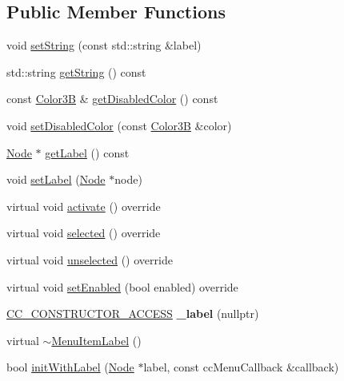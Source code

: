 \subsection*{Public Member Functions}
\begin{DoxyCompactItemize}
\item 
void \hyperlink{classMenuItemLabel_a792525a9b4ca9f196bb670ec849b7e42}{set\+String} (const std\+::string \&label)
\item 
std\+::string \hyperlink{classMenuItemLabel_a8eb49b748631f0f68d85ab7e61eaa21d}{get\+String} () const
\item 
const \hyperlink{structColor3B}{Color3B} \& \hyperlink{classMenuItemLabel_acebe3d1c892af9ca9b8c495211160790}{get\+Disabled\+Color} () const
\item 
void \hyperlink{classMenuItemLabel_ae486baf2a29a1270b9b127fcbca33c3e}{set\+Disabled\+Color} (const \hyperlink{structColor3B}{Color3B} \&color)
\item 
\hyperlink{classNode}{Node} $\ast$ \hyperlink{classMenuItemLabel_a4e54f5c99e05377f183c6b8f3aec1f55}{get\+Label} () const
\item 
void \hyperlink{classMenuItemLabel_a7aacf61512ed43bff64aebcdd2e8e1c5}{set\+Label} (\hyperlink{classNode}{Node} $\ast$node)
\item 
virtual void \hyperlink{classMenuItemLabel_a03b829211e9bf837d6e2febc1bee290c}{activate} () override
\item 
virtual void \hyperlink{classMenuItemLabel_aabdccb0d37847efa1a0ba0f717dcee30}{selected} () override
\item 
virtual void \hyperlink{classMenuItemLabel_ac2cc529a524150093ba996f90f150267}{unselected} () override
\item 
virtual void \hyperlink{classMenuItemLabel_a7297a6a7bf9e8f84d6cc783d4604adfd}{set\+Enabled} (bool enabled) override
\item 
\mbox{\label{classMenuItemLabel_a4e87b6094fba446b1cffe0a4002f69ba}} 
\hyperlink{_2cocos2d_2cocos_2base_2ccConfig_8h_a25ef1314f97c35a2ed3d029b0ead6da0}{C\+C\+\_\+\+C\+O\+N\+S\+T\+R\+U\+C\+T\+O\+R\+\_\+\+A\+C\+C\+E\+SS} {\bfseries \+\_\+label} (nullptr)
\item 
virtual \hyperlink{classMenuItemLabel_a69e2f0041f22e640b74ce001d9ba00c2}{$\sim$\+Menu\+Item\+Label} ()
\item 
bool \hyperlink{classMenuItemLabel_a3ef4f4b3d962dd6777a8840f5dda0473}{init\+With\+Label} (\hyperlink{classNode}{Node} $\ast$label, const cc\+Menu\+Callback \&callback)

\end{DoxyCompactItemize}
